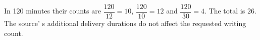 In 120 minutes their counts are $\dfrac{120}{12}=10$, $\dfrac{120}{10}=12$ and $\dfrac{120}{30}=4$. The total is $\boxed{26}$. The source' s additional delivery durations do not affect the requested writing count.
